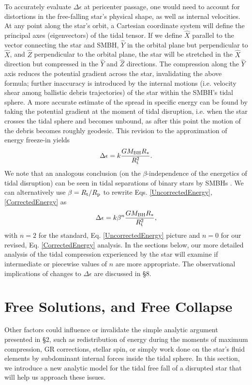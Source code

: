 \documentclass[useAMS, twocolumn, usenatbib]{mn2e}
\begin{document}
To accurately evaluate $\Delta\epsilon$ at pericenter passage, one would need to account for distortions in the free-falling star's physical shape, as well as internal velocities.  At any point along the star's orbit, a Cartesian coordinate system \citep{BrassartLuminet08} will define the principal axes (eigenvectors) of the tidal tensor.  If we define $\hat{X}$ parallel to the vector connecting the star and SMBH, $\hat{Y}$ in the orbital plane but perpendicular to $\hat{X}$, and $\hat{Z}$ perpendicular to the orbital plane, the star will be stretched in the $\hat{X}$ direction but compressed in the $\hat{Y}$ and $\hat{Z}$ directions.  The compression along the $\hat{Y}$ axis reduces the potential gradient across the star, invalidating the above formula; further inaccuracy is introduced by the internal motions (i.e. velocity shear among ballistic debris trajectories) of the star within the SMBH's tidal sphere.  A more accurate estimate of the spread in specific energy can be found by taking the potential gradient at the moment of tidal disruption, i.e. when the star crosses the tidal sphere and becomes unbound, as after this point the motion of the debris becomes roughly geodesic.  This revision to the approximation of energy freeze-in yields
\begin{equation}
\Delta \epsilon = k\frac{GM_{\rm BH} R_*}{R_{\rm t}^2}. \label{CorrectedEnergy}
\end{equation}
We note that an analogous conclusion (on the $\beta$-independence of the energetics of tidal disruption) can be seen in tidal separations of binary stars by SMBHs \citep[hereafter SKR10]{Sari+10}.  We can alternatively use $\beta=R_{\rm t}/R_{\rm p}$ to rewrite Eqs. \ref{UncorrectedEnergy}, \ref{CorrectedEnergy} as
\begin{equation}
\Delta \epsilon = k\beta^n \frac{GM_{\rm BH}R_*}{R_{\rm t}^2}, \label{ParamEnergy}
\end{equation}
with $n=2$ for the standard, Eq. \ref{UncorrectedEnergy} picture and $n=0$ for our revised, Eq. \ref{CorrectedEnergy} analysis.  In the sections below, our more detailed analysis of the tidal compression experienced by the star will examine if intermediate or piecewise values of $n$ are more appropriate.  The observational implications of changes to $\Delta \epsilon$ are discussed in \S 8.

\section{Free Solutions, and Free Collapse}
Other factors could influence or invalidate the simple analytic argument presented in \S 2, such as redistribution of energy during the moments of maximum compression, GR corrections, stellar spin, or simply work done on the star's fluid elements by subdominant internal forces inside the tidal sphere.  In this section, we introduce a new analytic model for the tidal free fall of a disrupted star that will help us approach these issues.
\end{document}
